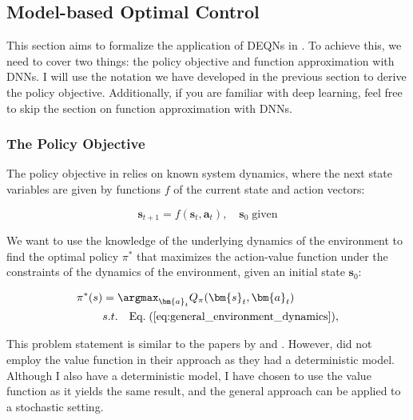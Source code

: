 \subsection{Model-based Optimal Control}
\label{subsec:model_based_optimal_control}

This section aims to formalize the application of DEQNs \parencite{Azinovic2022DEQN} in \textcite{Folini2024ClimateInCE, friedl2023_deepUQ}. To achieve this, we need to cover two things: the policy objective and function approximation with DNNs. I will use the notation we have developed in the previous section to derive the policy objective. Additionally, if you are familiar with deep learning, feel free to skip the section on function approximation with DNNs.

\subsubsection{The Policy Objective}
\label{sec:the policy objective,general}

The policy objective in \textcite{Folini2024ClimateInCE, friedl2023_deepUQ} relies on known system dynamics, where the next state variables are given by functions \(f\) of the current state and action vectors:

\begin{equation}
    \bm{s}_{t+1} = f(\bm{s}_t, \bm{a}_t), \quad \bm{s}_0 \; \text{given}
\label{eq:general_environment_dynamics}
\end{equation}

We want to use the knowledge of the underlying dynamics of the environment to find the optimal policy \(\pi^*\) that maximizes the action-value function under the constraints of the dynamics of the environment, given an initial state \(\bm{s}_0\):

\begin{equation}
\begin{aligned}
    \pi^*(s) &= \argmax_{\bm{a}_t} Q_\pi(\bm{s}_t, \bm{a}_t) \\
    &s.t. \quad \text{Eq.}\; (\ref{eq:general_environment_dynamics}),
\end{aligned}
\label{eq:optimal_policy_s.t._dynamics}
\end{equation}

This problem statement is similar to the papers by \textcite{friedl2023_deepUQ} and \textcite{Folini2024ClimateInCE}. However, \textcite{Folini2024ClimateInCE} did not employ the value function in their approach as they had a deterministic model. Although I also have a deterministic model, I have chosen to use the value function as it yields the same result, and the general approach can be applied to a stochastic setting.


